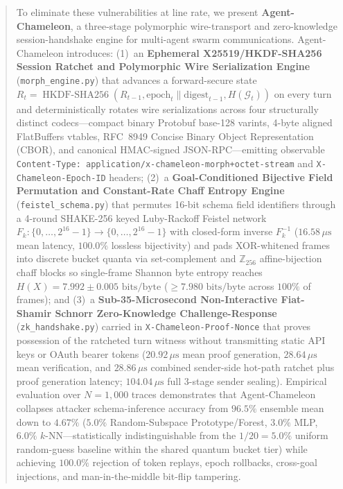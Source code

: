 \documentclass[conference,10pt]{IEEEtran}
\begin{document}
\begin{abstract}
To eliminate these vulnerabilities at line rate, we present \textbf{Agent-Chameleon}, a three-stage polymorphic wire-transport and zero-knowledge session-handshake engine for multi-agent swarm communications. Agent-Chameleon introduces: (1)~an \textbf{Ephemeral X25519/HKDF-SHA256 Session Ratchet and Polymorphic Wire Serialization Engine} (\texttt{morph\_engine.py}) that advances a forward-secure state $R_t = \operatorname{HKDF-SHA256}(R_{t-1}, \text{epoch}_t \parallel \text{digest}_{t-1}, H(\mathcal{G}_t))$ on every turn and deterministically rotates wire serializations across four structurally distinct codecs---compact binary Protobuf base-128 varints, 4-byte aligned FlatBuffers vtables, RFC~8949 Concise Binary Object Representation (CBOR), and canonical HMAC-signed JSON-RPC---emitting observable \texttt{Content-Type: application/x-chameleon-morph+octet-stream} and \texttt{X-Chameleon-Epoch-ID} headers; (2)~a \textbf{Goal-Conditioned Bijective Field Permutation and Constant-Rate Chaff Entropy Engine} (\texttt{feistel\_schema.py}) that permutes 16-bit schema field identifiers through a 4-round SHAKE-256 keyed Luby-Rackoff Feistel network $F_k: \{0,\dots,2^{16}-1\} \to \{0,\dots,2^{16}-1\}$ with closed-form inverse $F_k^{-1}$ ($16.58\,\mu\text{s}$ mean latency, $100.0\%$ lossless bijectivity) and pads XOR-whitened frames into discrete bucket quanta via set-complement and $\mathbb{Z}_{256}$ affine-bijection chaff blocks so single-frame Shannon byte entropy reaches $H(X) = 7.992 \pm 0.005\text{ bits/byte}$ ($\ge 7.980\text{ bits/byte}$ across $100\%$ of frames); and (3)~a \textbf{Sub-35-Microsecond Non-Interactive Fiat-Shamir Schnorr Zero-Knowledge Challenge-Response} (\texttt{zk\_handshake.py}) carried in \texttt{X-Chameleon-Proof-Nonce} that proves possession of the ratcheted turn witness without transmitting static API keys or OAuth bearer tokens ($20.92\,\mu\text{s}$ mean proof generation, $28.64\,\mu\text{s}$ mean verification, and $28.86\,\mu\text{s}$ combined sender-side hot-path ratchet plus proof generation latency; $104.04\,\mu\text{s}$ full 3-stage sender sealing). Empirical evaluation over $N = 1{,}000$ traces demonstrates that Agent-Chameleon collapses attacker schema-inference accuracy from $96.5\%$ ensemble mean down to $4.67\%$ ($5.0\%$ Random-Subspace Prototype/Forest, $3.0\%$ MLP, $6.0\%$ $k$-NN---statistically indistinguishable from the $1/20 = 5.0\%$ uniform random-guess baseline within the shared quantum bucket tier) while achieving $100.0\%$ rejection of token replays, epoch rollbacks, cross-goal injections, and man-in-the-middle bit-flip tampering.
\end{abstract}
\end{document}
